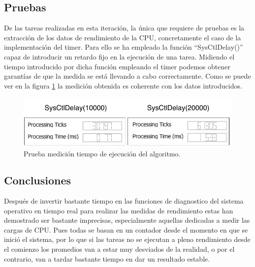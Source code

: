     \subsection{Pruebas}
        
        De las tareas realizadas en esta iteración, la única que requiere de pruebas es la extracción de los datos de rendimiento de la CPU, concretamente el caso de la implementación del timer. Para ello se ha empleado la función ``SysCtlDelay()'' capaz de introducir un retardo fijo en la ejecución de una tarea. Midiendo el tiempo introducido por dicha función empleando el timer podemos obtener garantías de que la medida se está llevando a cabo correctamente. Como se puede ver en la figura \ref{fig:performanceTest} la medición obtenida es coherente con los datos introducidos.
        
        \begin{figure}[H]
                \centering
                        \includegraphics[width = 0.9 \linewidth]{figuras/PerformanceTest.pdf}
                \caption{Prueba medición tiempo de ejecución del algoritmo.}
                \label{fig:performanceTest}
        \end{figure}

    \subsection{Conclusiones}
    
        Después de invertir bastante tiempo en las funciones de diagnostico del sistema operativo en tiempo real para realizar las medidas de rendimiento estas han demostrado ser bastante imprecisas, especialmente aquellas dedicadas a medir las cargas de CPU. Pues todas se basan en un contador desde el momento en que se inició el sistema, por lo que si las tareas no se ejecutan a pleno rendimiento desde el comienzo los promedios van a estar muy desviados de la realidad, o por el contrario, van a tardar bastante tiempo en dar un resultado estable.